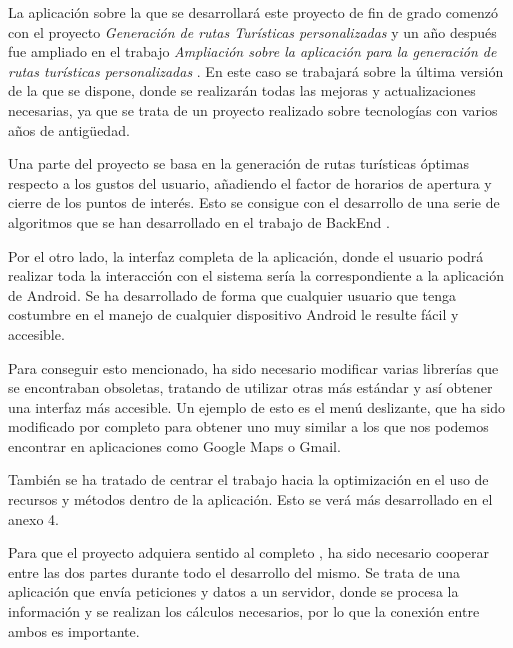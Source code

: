 
La aplicación sobre la que se desarrollará este proyecto de fin de grado comenzó con el proyecto \textit{Generación de rutas Turísticas personalizadas} \cite{tfg1} y un año después fue ampliado en el trabajo \textit{Ampliación sobre la aplicación para la generación de rutas turísticas personalizadas} \cite{tfm1}. En este caso se trabajará sobre la última versión de la que se dispone, donde se realizarán todas las mejoras y actualizaciones necesarias, ya que se trata de un proyecto realizado sobre tecnologías con varios años de antigüedad.

Una parte del proyecto se basa en la generación de rutas turísticas óptimas respecto a los gustos del usuario, añadiendo el factor de horarios de apertura y cierre de los puntos de interés. Esto se consigue con el desarrollo de una serie de algoritmos que se han desarrollado en el trabajo de BackEnd \cite{tfg2}.

Por el otro lado, la interfaz completa de la aplicación, donde el usuario podrá realizar toda la interacción con el sistema sería la correspondiente a la aplicación de Android. Se ha desarrollado de forma que cualquier usuario que tenga costumbre en el manejo de cualquier dispositivo Android le resulte fácil y accesible.

Para conseguir esto mencionado, ha sido necesario modificar varias librerías que se encontraban obsoletas, tratando de utilizar otras más estándar y así obtener una interfaz más accesible. Un ejemplo de esto es el menú deslizante, que ha sido modificado por completo para obtener uno muy similar a los que nos podemos encontrar en aplicaciones como Google Maps o Gmail.

También se ha tratado de centrar el trabajo hacia la optimización en el uso de recursos y métodos dentro de la aplicación. Esto se verá más desarrollado en el anexo 4.

Para que el proyecto adquiera sentido al completo , ha sido necesario cooperar entre las dos partes durante todo el desarrollo del mismo. Se trata de una aplicación que envía peticiones y datos a un servidor, donde se procesa la información y se realizan los cálculos necesarios, por lo que la conexión entre ambos es importante.

